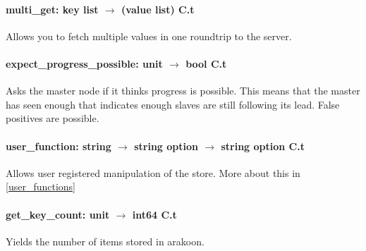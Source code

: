 \paragraph{multi\_get: key list $\rightarrow$ (value list) C.t}
Allows you to fetch multiple values in one roundtrip to the server.

\paragraph{expect\_progress\_possible: unit $\rightarrow$ bool C.t}
Asks the master node if it thinks progress is possible. 
This means that the master has seen enough that indicates enough slaves are still following its lead. 
False positives are possible.

\paragraph{user\_function: string $\rightarrow$ 
  string option $\rightarrow$ 
  string option C.t}
Allows user registered manipulation of the store. 
More about this in \ref{user_functions}

\paragraph{get\_key\_count: unit $\rightarrow$ int64 C.t}
Yields the number of items stored in arakoon.
